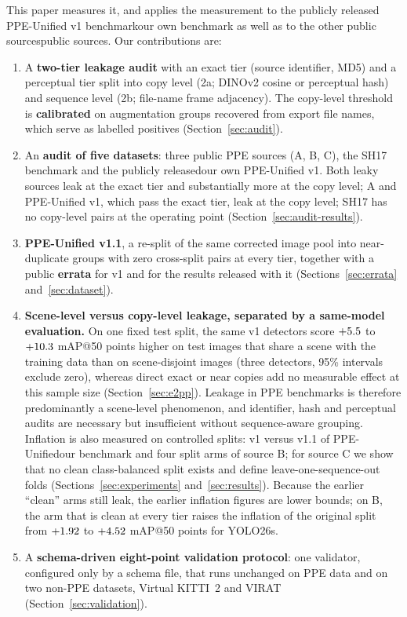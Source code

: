 \documentclass[review,12pt]{elsarticle}
\newcommand{\anonor}[2]{\ifdefined\ANON#1\else#2\fi}
\begin{document}
This paper measures it, and applies the measurement to \anonor{the publicly
released PPE-Unified v1 benchmark}{our own
benchmark} as well as to the \anonor{other public sources}{public sources}. Our contributions are:
\begin{enumerate}
\item A \textbf{two-tier leakage audit} with an exact tier (source
identifier, MD5) and a perceptual tier split into copy level (2a;
DINOv2 cosine or perceptual hash) and sequence level (2b; file-name
frame adjacency). The copy-level threshold is \textbf{calibrated} on
augmentation groups recovered from export file names, which serve as
labelled positives (Section~\ref{sec:audit}).
\item An \textbf{audit of five datasets}: three public PPE sources
(A, B, C), the SH17 benchmark \citep{ahmad2024sh17} and \anonor{the publicly released}{our own}
PPE-Unified v1. Both leaky sources leak at the exact tier and
substantially more at the copy level; A and PPE-Unified v1, which pass
the exact tier, leak at the copy level; SH17 has no copy-level pairs at
the operating point (Section~\ref{sec:audit-results}).
\item \textbf{PPE-Unified v1.1}, a re-split of the same corrected
image pool into near-duplicate groups with zero cross-split pairs at
every tier, together with a public \textbf{errata} for v1 and for the
results released with it (Sections~\ref{sec:errata}
and~\ref{sec:dataset}).
\item \textbf{Scene-level versus copy-level leakage, separated by a
same-model evaluation.} On one fixed test split, the same v1 detectors
score $+5.5$ to $+10.3$ mAP@50 points higher on
test images that share a scene with the training data than on
scene-disjoint images (three detectors, 95\% intervals exclude zero),
whereas direct exact or near copies add no measurable effect at this
sample size (Section~\ref{sec:e2pp}). Leakage in PPE benchmarks is
therefore predominantly a scene-level phenomenon, and identifier, hash
and perceptual audits are necessary but insufficient without
sequence-aware grouping. Inflation is also measured on controlled
splits: v1 versus v1.1 of \anonor{PPE-Unified}{our benchmark} and four split arms of
source B; for source C we show that no clean class-balanced split
exists and define leave-one-sequence-out folds (Sections~\ref{sec:experiments}
and~\ref{sec:results}). Because the earlier ``clean'' arms still leak,
the earlier inflation figures are lower bounds; on B, the arm that is
clean at every tier raises the inflation of the original split from
$+1.92$ to $+4.52$ mAP@50 points for YOLO26s.
\item A \textbf{schema-driven eight-point validation protocol}: one
validator, configured only by a schema file, that runs unchanged on PPE
data and on two non-PPE datasets, Virtual KITTI~2 and VIRAT
(Section~\ref{sec:validation}).
\end{enumerate}
\end{document}

